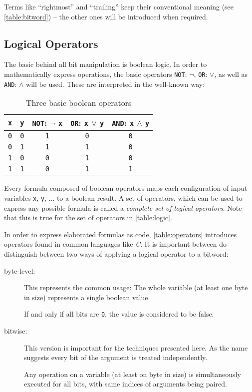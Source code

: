 Terms like ``rightmost'' and ``trailing''
keep their conventional meaning (see \autoref{table:bitword})
-- the other ones will be introduced when required.


\subsection*{Logical Operators}
The basic behind all bit manipulation is boolean logic.
In order to mathematically express operations, the basic operators
\lstinline$NOT$: $\lnot$, \lstinline$OR$: $\lor$,
as well as \lstinline$AND$: $\land$ will be used.
These are interpreted in the well-known way:

\begin{table}[h]
\centering
\begin{tabular}{c|c||c|c|c}
  \lstinline$x$ & \lstinline$y$
& \lstinline$NOT$: $\lnot$ \lstinline$x$
& \lstinline$OR$: \lstinline$x$ $\lor$ \lstinline$y$
& \lstinline$AND$: \lstinline$x$ $\land$ \lstinline$y$\\
\hline\hline
  \lstinline$0$ & \lstinline$0$
& \lstinline$1$ & \lstinline$0$ & \lstinline$0$\\
\hline
  \lstinline$0$ & \lstinline$1$
& \lstinline$1$ & \lstinline$1$ & \lstinline$0$\\
\hline
  \lstinline$1$ & \lstinline$0$
& \lstinline$0$ & \lstinline$1$ & \lstinline$0$\\
\hline
  \lstinline$1$ & \lstinline$1$
& \lstinline$0$ & \lstinline$1$ & \lstinline$1$\\
\end{tabular}
\caption{Three basic boolean operators}
\label{table:logic}
\end{table}

Every formula composed of boolean operators maps
each configuration of input variables
\lstinline$x$, \lstinline$y$, $\dots$ to a boolean result.
A set of operators, which can be used to express any possible formula
is called a \emph{complete set of logical operators}.
Note that this is true for the set of operators in \autoref{table:logic}.

In order to express elaborated formulas as code,
\autoref{table:operators} introduces operators
found in common languages like \emph{C}.
It is important between do distinguish between
two ways of applying a logical operator to a bitword:

\begin{description}
\item[byte-level:] This represents the common usage:
The whole variable (at least one byte in size)
represents a single boolean value.

If and only if all bits are \lstinline$0$,
the value is considered to be false.

\item[bitwise:] This version is important for the techniques presented here.
As the name suggests every bit of the argument is treated independently.

Any operation on a variable (at least on byte in size)
is simultaneously executed for all bits,
with same indices of arguments being paired.
\end{description}

